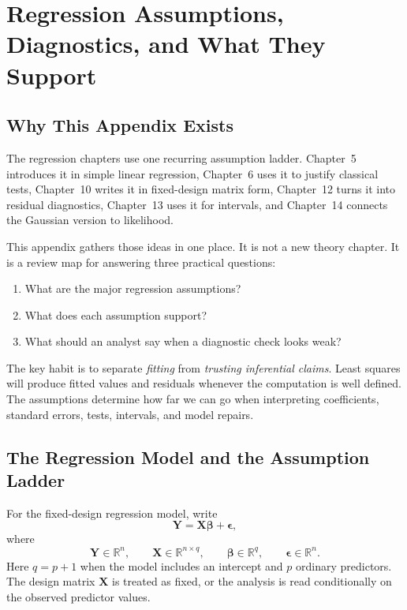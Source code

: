 \chapter[Regression Assumption Ladder]{Regression Assumptions, Diagnostics, and What They Support}
\label{app:regression-assumption-ladder}

\section{Why This Appendix Exists}

The regression chapters use one recurring assumption ladder.  Chapter~5 introduces it in simple linear regression, Chapter~6 uses it to justify classical tests, Chapter~10 writes it in fixed-design matrix form, Chapter~12 turns it into residual diagnostics, Chapter~13 uses it for intervals, and Chapter~14 connects the Gaussian version to likelihood.

This appendix gathers those ideas in one place.  It is not a new theory chapter.  It is a review map for answering three practical questions:
\begin{enumerate}
  \item What are the major regression assumptions?
  \item What does each assumption support?
  \item What should an analyst say when a diagnostic check looks weak?
\end{enumerate}

The key habit is to separate \emph{fitting} from \emph{trusting inferential claims}.  Least squares will produce fitted values and residuals whenever the computation is well defined.  The assumptions determine how far we can go when interpreting coefficients, standard errors, tests, intervals, and model repairs.

\section{The Regression Model and the Assumption Ladder}

For the fixed-design regression model, write
\begin{equation}
  \mathbf{Y}=\mathbf{X}\boldsymbol{\beta}+\boldsymbol{\epsilon},
  \label{eq:app-reg-model}
\end{equation}
where
\begin{equation}
  \mathbf{Y}\in\mathbb{R}^n,
  \qquad
  \mathbf{X}\in\mathbb{R}^{n\times q},
  \qquad
  \boldsymbol{\beta}\in\mathbb{R}^{q},
  \qquad
  \boldsymbol{\epsilon}\in\mathbb{R}^{n}.
\end{equation}
Here \(q=p+1\) when the model includes an intercept and \(p\) ordinary predictors.  The design matrix \(\mathbf{X}\) is treated as fixed, or the analysis is read conditionally on the observed predictor values.

